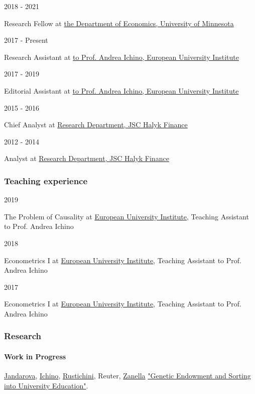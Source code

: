 \documentclass[
  american,
]{article}
\begin{document}
2018 - 2021

Research Fellow at \href{https://cla.umn.edu/economics}{the Department
of Economics, University of Minnesota}

2017 - Present

Research Assistant at \href{https://www.eui.eu}{to Prof. Andrea Ichino,
European University Institute}

2017 - 2019

Editorial Assistant at \href{https://www.eui.eu}{to Prof. Andrea Ichino,
European University Institute}

2015 - 2016

Chief Analyst at \href{https://www.halykfinance.kz}{Research Department,
JSC Halyk Finance}

2012 - 2014

Analyst at \href{https://www.halykfinance.kz}{Research Department, JSC
Halyk Finance}

\hypertarget{teaching}{}
\hypertarget{teaching-experience}{%
\subsubsection{Teaching experience}\label{teaching-experience}}

2019

The Problem of Causality at \href{https://www.eui.eu}{European
University Institute}, Teaching Assistant to Prof. Andrea Ichino

2018

Econometrics I at \href{https://www.eui.eu}{European University
Institute}, Teaching Assistant to Prof. Andrea Ichino

2017

Econometrics I at \href{https://www.eui.eu}{European University
Institute}, Teaching Assistant to Prof. Andrea Ichino

\hypertarget{publications}{}
\hypertarget{research}{%
\subsubsection{Research}\label{research}}

\hypertarget{work-in-progress}{%
\paragraph{Work in Progress}\label{work-in-progress}}

{ {\href{/authors/admin/}{Jandarova}},
{\href{http://www.andreaichino.it}{Ichino}},
{\href{https://sites.google.com/site/aldorustichini/}{Rustichini}},
{Reuter}, {\href{https://sites.google.com/site/giuliozanella/}{Zanella}}
} \href{/publication/work-in-progress/uni-sorting-genetics/}{"Genetic
Endowment and Sorting into University Education"}.
\end{document}

